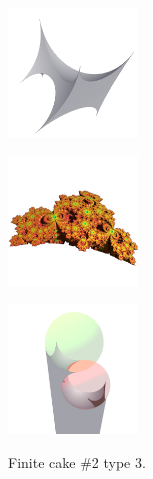 \documentclass[suppldata, dvipdfmx]{interact}
\theoremstyle{plain}%
\theoremstyle{definition}
\theoremstyle{remark}
\theoremstyle{problemstyle}
\begin{document}
\begin{figure}[h!tbp]
 \begin{minipage}{0.5\textwidth}
  \begin{minipage}[t]{0.24\textwidth}
   \centering \includegraphics[width=1.35in, height=1.35in,
   keepaspectratio]{./img/sphairahedron/hexahedralCake2/sphairahedronFinite_c.jpg}
   \label{fig:cake2type3finiteSphairahedron}
  \end{minipage}
  \hspace*{\fill}
  \begin{minipage}[t]{0.24\textwidth}
   \centering
   \includegraphics[width=1.35in, height=1.35in,
   keepaspectratio]{./img/sphairahedron/hexahedralCake2/limitsetFinite_c.jpg}
   \label{fig:cake2type3finiteLimitset}
  \end{minipage}
  \hspace*{\fill}
  \caption{Finite cake \#2 type 3.}
  \label{fig:cake2Type3finite}
 \end{minipage}
 \hspace*{\fill}
 \begin{minipage}{0.5\textwidth}
  \begin{minipage}[t]{0.24\textwidth}
   \centering
   \includegraphics[width=1.35in, height=1.35in,
   keepaspectratio]{./img/sphairahedron/hexahedralCake2/sphairahedronInf_c.jpg}
   \label{fig:cake2type3infiniteSphairahedron}

\end{minipage}
\end{minipage}
\end{figure}
\end{document}
